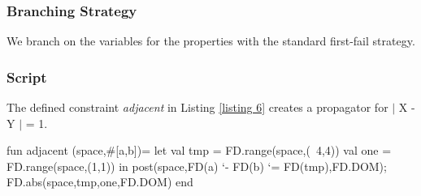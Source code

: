 \documentclass[a4paper]{scrartcl}
\begin{document}
\subsubsection{Branching Strategy}
We branch on the variables for the properties with the 
standard first-fail strategy. 

\subsubsection{Script}
The defined constraint {\it adjacent} in Listing \ref{listing 6}
creates a propagator for $|$ X - Y $|$ = 1.
\begin{myverbatim}
fun adjacent (space,#[a,b])=
        let
           val tmp = FD.range(space,(~4,4))
           val one = FD.range(space,(1,1))
        in
           post(space,FD(a) `- FD(b) `= FD(tmp),FD.DOM);
           FD.abs(space,tmp,one,FD.DOM)
        end



\end{myverbatim}
\end{document}

